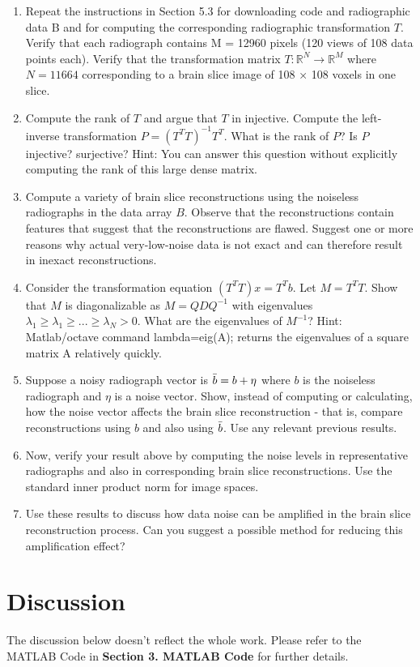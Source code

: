 \documentclass{article}
\begin{document}
\begin{enumerate}
    \item Repeat the instructions in Section 5.3 for downloading code and radiographic data B and for computing the corresponding radiographic transformation $T$. Verify that each radiograph contains M = 12960 pixels (120 views of 108 data points each). Verify that the transformation matrix $T : \mathbb{R}^{N} \to \mathbb{R}^{M}$ where $N = 11664$ corresponding to a brain slice image of 108 × 108 voxels in one slice.
    \item Compute the rank of $T$ and argue that $T$ in injective. Compute the left-inverse transformation $P = (T^TT)^{-1}T^T$. What is the rank of $P$? Is $P$ injective? surjective? Hint: You can answer this question without explicitly computing the rank of this large dense matrix.
    \item Compute a variety of brain slice reconstructions using the noiseless radiographs in the data array $B$. Observe that the reconstructions contain features that suggest that the reconstructions are flawed. Suggest one or more reasons why actual very-low-noise data is not exact and can therefore result in inexact reconstructions.
    \item Consider the transformation equation $(T^TT)x = T^Tb$. Let $M = T^TT$. Show that $M$ is diagonalizable as $M = QDQ^{−1}$ with eigenvalues $\lambda_1 \ge \lambda_1 \ge ... \ge \lambda_N > 0$. What are the eigenvalues of $M^{−1}$? Hint: Matlab/octave command lambda=eig(A); returns the eigenvalues of a square matrix A relatively quickly.
    \item Suppose a noisy radiograph vector is $\Bar{b} = b + \eta$ where $b$ is the noiseless radiograph and $\eta$ is a noise vector. Show, instead of computing or calculating, how the noise vector affects the brain slice reconstruction - that is, compare reconstructions using $b$ and also using $\Bar{b}$. Use any relevant previous results.
    \item Now, verify your result above by computing the noise levels in representative radiographs and also in corresponding brain slice reconstructions. Use the standard inner product norm for image spaces.
    \item Use these results to discuss how data noise can be amplified in the brain slice reconstruction process. Can you suggest a possible method for reducing this amplification effect?
\end{enumerate}
\pagebreak
\section{Discussion}
The discussion below doesn't reflect the whole work. Please refer to the MATLAB Code in \textbf{Section 3. MATLAB Code} for further details.
\end{document}
